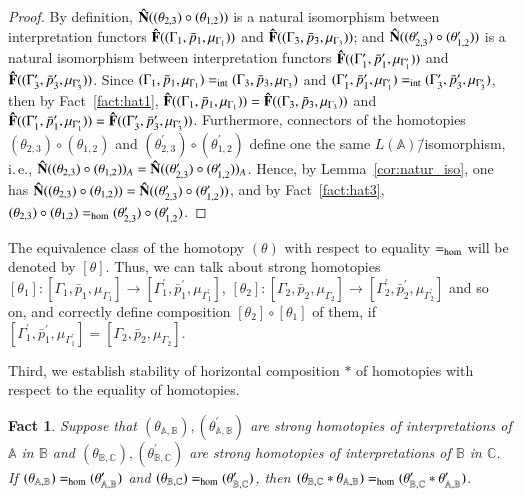 \documentclass[12pt]{article}
\newtheorem{fact}{Fact}
\theoremstyle{definition}
\def\MA{{\mathbb{A}}}
\def\MB{{\mathbb{B}}}
\def\MC{{\mathbb{C}}}
\begin{document}
\begin{proof}
By definition, ${\bf \hat N}((\theta_{2,3})\circ(\theta_{1,2}))$ is a natural isomorphism between interpretation functors ${\bf\hat F}((\Gamma_1,\bar p_1,\mu_{\Gamma_1}))$ and ${\bf\hat F}((\Gamma_3,\bar p_3,\mu_{\Gamma_3}))$; and ${\bf \hat N}((\theta^\prime_{2,3})\circ(\theta^\prime_{1,2}))$ is a natural isomorphism between interpretation functors ${\bf\hat F}((\Gamma^\prime_1,\bar p^\prime_1,\mu_{\Gamma^\prime_1}))$ and ${\bf\hat F}((\Gamma^\prime_3,\bar p^\prime_3,\mu_{\Gamma^\prime_3}))$. Since $(\Gamma_1,\bar p_1,\mu_{\Gamma_1})=_{\rm int}(\Gamma_3,\bar p_3,\mu_{\Gamma_3})$ and $(\Gamma^\prime_1,\bar p^\prime_1,\mu_{\Gamma^\prime_1})=_{\rm int}(\Gamma^\prime_3,\bar p^\prime_3,\mu_{\Gamma^\prime_3})$, then by Fact~\ref{fact:hat1}, ${\bf\hat F}((\Gamma_1,\bar p_1,\mu_{\Gamma_1}))={\bf\hat F}((\Gamma_3,\bar p_3,\mu_{\Gamma_3}))$ and ${\bf\hat F}((\Gamma^\prime_1,\bar p^\prime_1,\mu_{\Gamma^\prime_1}))={\bf\hat F}((\Gamma^\prime_3,\bar p^\prime_3,\mu_{\Gamma^\prime_3}))$. Furthermore, connectors of the homotopies $(\theta_{2,3})\circ(\theta_{1,2})$ and $(\theta^\prime_{2,3})\circ(\theta^\prime_{1,2})$ define one the same $L(\MA)$\=/isomorphism, i.\,e., ${\bf \hat N}((\theta_{2,3})\circ(\theta_{1,2}))_A={\bf \hat N}((\theta^\prime_{2,3})\circ(\theta^\prime_{1,2}))_A$. Hence, by Lemma~\ref{cor:natur_iso}, one has ${\bf \hat N}((\theta_{2,3})\circ(\theta_{1,2}))={\bf \hat N}((\theta^\prime_{2,3})\circ(\theta^\prime_{1,2}))$, and by Fact~\ref{fact:hat3}, $(\theta_{2,3})\circ(\theta_{1,2})=_{\rm hom}(\theta^\prime_{2,3})\circ(\theta^\prime_{1,2})$.
\end{proof}

The equivalence class of the homotopy $(\theta)$ with respect to equality $=_{\rm hom}$ will be denoted by $[\theta]$. Thus, we can talk about strong homotopies $[\theta_{1}]\colon [\Gamma_1,\bar p_1,\mu_{\Gamma_1}]\to [\Gamma_1^\prime,\bar p_1^\prime,\mu_{\Gamma^\prime_1}]$, $[\theta_{2}]\colon [\Gamma_2,\bar p_2,\mu_{\Gamma_2}]\to [\Gamma_2^\prime,\bar p_2^\prime,\mu_{\Gamma^\prime_2}]$ and so on, and correctly define composition $[\theta_2]\circ [\theta_1]$ of them, if $[\Gamma_1^\prime,\bar p_1^\prime,\mu_{\Gamma^\prime_1}]=[\Gamma_2,\bar p_2,\mu_{\Gamma_2}]$.

Third, we establish stability of horizontal composition $\ast$ of homotopies with respect to the equality of homotopies.

\begin{fact}\label{prop3:par}
Suppose that $(\theta_{\MA,\MB}), (\theta^\prime_{\MA,\MB})$ are strong homotopies of interpretations of $\MA$ in $\MB$ and $(\theta_{\MB,\MC}), (\theta^\prime_{\MB,\MC})$ are strong homotopies of interpretations of $\MB$ in $\MC$. If $(\theta_{\MA,\MB})=_{\rm hom} (\theta^\prime_{\MA,\MB})$ and $(\theta_{\MB,\MC})=_{\rm hom} (\theta^\prime_{\MB,\MC})$, then $(\theta_{\MB,\MC}\ast\theta_{\MA,\MB})=_{\rm hom}(\theta^\prime_{\MB,\MC}\ast\theta^\prime_{\MA,\MB})$. 
\end{fact}
\end{document}
